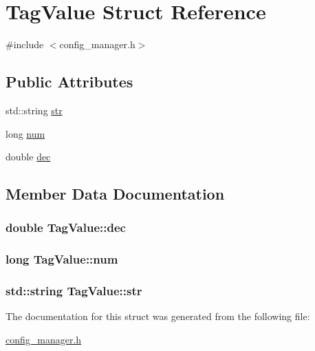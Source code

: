 \hypertarget{structTagValue}{\section{Tag\-Value Struct Reference}
\label{structTagValue}
}


{\ttfamily \#include $<$config\-\_\-manager.\-h$>$}

\subsection*{Public Attributes}
\begin{DoxyCompactItemize}
\item 
std\-::string \hyperlink{structTagValue_ad588e4c422bcef3e428b1e7a53018e9b}{str}
\item 
long \hyperlink{structTagValue_a968ed84fa6cfccba6ef104f663ae3c08}{num}
\item 
double \hyperlink{structTagValue_a641f80e1d15c3c3e60e1cec4a83c952b}{dec}
\end{DoxyCompactItemize}


\subsection{Member Data Documentation}
\hypertarget{structTagValue_a641f80e1d15c3c3e60e1cec4a83c952b}{
\subsubsection[{dec}]{\setlength{\rightskip}{0pt plus 5cm}double Tag\-Value\-::dec}}\label{structTagValue_a641f80e1d15c3c3e60e1cec4a83c952b}
\hypertarget{structTagValue_a968ed84fa6cfccba6ef104f663ae3c08}{
\subsubsection[{num}]{\setlength{\rightskip}{0pt plus 5cm}long Tag\-Value\-::num}}\label{structTagValue_a968ed84fa6cfccba6ef104f663ae3c08}
\hypertarget{structTagValue_ad588e4c422bcef3e428b1e7a53018e9b}{
\subsubsection[{str}]{\setlength{\rightskip}{0pt plus 5cm}std\-::string Tag\-Value\-::str}}\label{structTagValue_ad588e4c422bcef3e428b1e7a53018e9b}


The documentation for this struct was generated from the following file\-:\begin{DoxyCompactItemize}
\item 
\hyperlink{config__manager_8h}{config\-\_\-manager.\-h}\end{DoxyCompactItemize}
